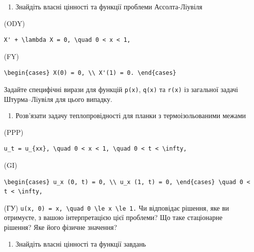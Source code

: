 \documentclass[
  ukrainian,
]{article}
\providecommand{\tightlist}{%
  \setlength{\itemsep}{0pt}\setlength{\parskip}{0pt}}
\begin{document}
\begin{enumerate}
\def\labelenumi{\arabic{enumi}.}
\setcounter{enumi}{1}
\tightlist
\item
  Знайдіть власні цінності та функції проблеми Ассолта-Ліувіля
\end{enumerate}

(ODY)

\begin{verbatim}
X' + \lambda X = 0, \quad 0 < x < 1,
\end{verbatim}

(FY)

\begin{verbatim}
\begin{cases} X(0) = 0, \\ X'(1) = 0. \end{cases}
\end{verbatim}

Задайте специфічні вирази для функцій \texttt{p(x)}, \texttt{q(x)} та
\texttt{r(x)} із загальної задачі Штурма--Ліувіля для цього випадку.

\begin{enumerate}
\def\labelenumi{\arabic{enumi}.}
\setcounter{enumi}{2}
\tightlist
\item
  Розв'язати задачу теплопровідності для планки з термоізольованими
  межами
\end{enumerate}

(PPP)

\begin{verbatim}
u_t = u_{xx}, \quad 0 < x < 1, \quad 0 < t < \infty,
\end{verbatim}

(GI)

\begin{verbatim}
\begin{cases} u_x (0, t) = 0, \\ u_x (1, t) = 0, \end{cases} \quad 0 < t < \infty,
\end{verbatim}

(ГУ)
\texttt{u(x,\ 0)\ =\ x,\ \textbackslash{}quad\ 0\ \textbackslash{}le\ x\ \textbackslash{}le\ 1.}
Чи відповідає рішення, яке ви отримуєте, з вашою інтерпретацією цієї
проблеми? Що таке стаціонарне рішення? Яке його фізичне значення?

\begin{enumerate}
\def\labelenumi{\arabic{enumi}.}
\setcounter{enumi}{3}
\tightlist
\item
  Знайдіть власні цінності та функції завдань
\end{enumerate}
\end{document}
